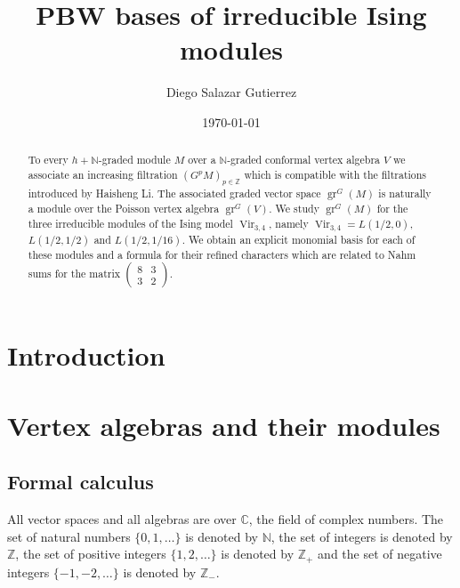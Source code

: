 \documentclass[a4paper, 12pt, reqno]{amsart}
\theoremstyle{remark}
\numberwithin{equation}{subsection}
\DeclareMathOperator{\Vir}{Vir}
\DeclareMathOperator{\gr}{gr}
\begin{document}
\begin{abstract}
  To every $h + \mathbb{N}$-graded module $M$ over a $\mathbb{N}$-graded conformal vertex algebra $V$ we associate an increasing filtration $(G^pM)_{p \in \mathbb{Z}}$ which is compatible with the filtrations introduced by Haisheng Li.
  The associated graded vector space $\gr^G(M)$ is naturally a module over the Poisson vertex algebra $\gr^G(V)$.
  We study $\gr^G(M)$ for the three irreducible modules of the Ising model $\Vir_{3, 4}$, namely $\Vir_{3,4} = L(1/2, 0)$, $L(1/2, 1/2)$ and $L(1/2, 1/16)$.
  We obtain an explicit monomial basis for each of these modules and a formula for their refined characters which are related to Nahm sums for the matrix $\left(\begin{smallmatrix} 8 & 3 \\ 3 & 2 \end{smallmatrix}\right)$.
\end{abstract}

\title{PBW bases of irreducible Ising modules}
\author{Diego Salazar Gutierrez}
\address{Instituto de Matemática Pura e Aplicada, Rio de Janeiro, RJ, Brazil}
\date{\today}
\maketitle

\tableofcontents

\section{Introduction}
\label{sec:introduction}

\section{Vertex algebras and their modules}
\label{sec:vert-algebr-their}

\subsection{Formal calculus}
\label{sec:formal-calculus}

All vector spaces and all algebras are over $\mathbb{C}$, the field of complex numbers.
The set of natural numbers $\{0, 1, \dots\}$ is denoted by $\mathbb{N}$, the set of integers is denoted by $\mathbb{Z}$, the set of positive integers $\{1, 2, \dots\}$ is denoted by $\mathbb{Z}_+$ and the set of negative integers $\{-1, -2, \dots\}$ is denoted by $\mathbb{Z}_-$.
\end{document}
